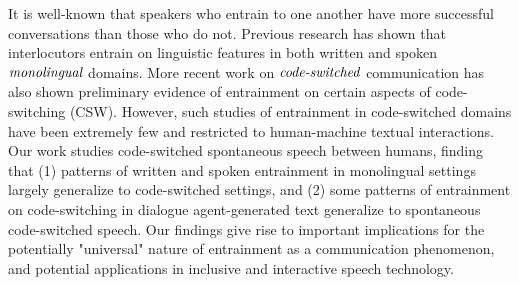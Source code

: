 It is well-known that speakers who entrain to one another have more successful conversations than those who do not. Previous research has shown that interlocutors entrain on linguistic features in both written and spoken $\emph{monolingual}$ domains. More recent work on $\emph{code-switched}$ communication has also shown preliminary evidence of entrainment on certain aspects of code-switching (CSW). However, such studies of entrainment in code-switched domains have been extremely few and restricted to human-machine textual interactions. Our work studies code-switched spontaneous speech between humans, finding that (1) patterns of written and spoken entrainment in monolingual settings largely generalize to code-switched settings, and (2) some patterns of entrainment on code-switching in dialogue agent-generated text generalize to spontaneous code-switched speech. Our findings give rise to important implications for the potentially "universal" nature of entrainment as a communication phenomenon, and potential applications in inclusive and interactive speech technology.